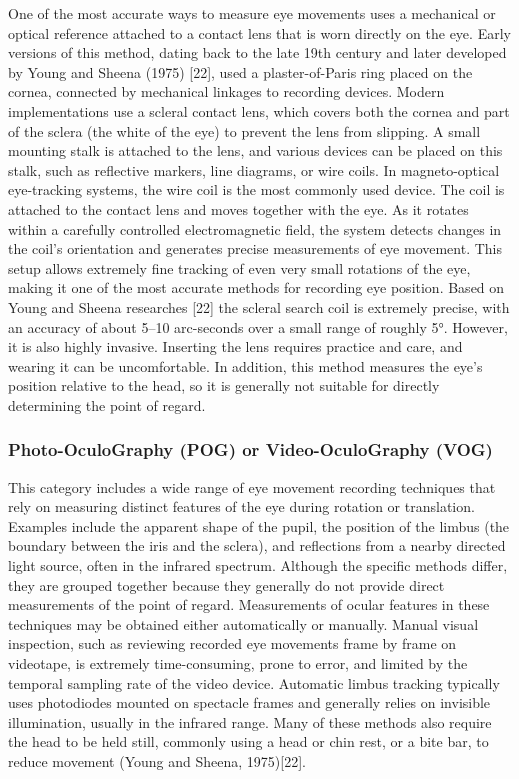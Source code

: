 \documentclass{article}
\begin{document}
One of the most accurate ways to measure eye movements uses a mechanical or optical reference attached to a contact lens that is worn directly on the eye. 
Early versions of this method, dating back to the late 19th century and later developed by Young and Sheena (1975) [22], used a plaster-of-Paris ring placed on the cornea, connected by mechanical linkages to recording devices.
Modern implementations use a scleral contact lens, which covers both the cornea and part of the sclera (the white of the eye) to prevent the lens from slipping.
A small mounting stalk is attached to the lens, and various devices can be placed on this stalk, such as reflective markers, line diagrams, or wire coils.
In magneto-optical eye-tracking systems, the wire coil is the most commonly used device. The coil is attached to the contact lens and moves together with the eye. 
As it rotates within a carefully controlled electromagnetic field, the system detects changes in the coil's orientation and generates precise measurements of eye movement. This setup allows extremely fine tracking of even very small rotations of the eye, making it one of the most accurate methods for recording eye position.
Based on Young and Sheena researches [22] the scleral search coil is extremely precise, with an accuracy of about 5–10 arc-seconds over a small range of roughly 5°. 
However, it is also highly invasive. 
Inserting the lens requires practice and care, and wearing it can be uncomfortable. 
In addition, this method measures the eye's position relative to the head, so it is generally not suitable for directly determining the point of regard.

\subsubsection{Photo-OculoGraphy (POG) or Video-OculoGraphy (VOG)}

This category includes a wide range of eye movement recording techniques that rely on measuring distinct features of the eye during rotation or translation. 
Examples include the apparent shape of the pupil, the position of the limbus (the boundary between the iris and the sclera), and reflections from a nearby directed light source, often in the infrared spectrum. 
Although the specific methods differ, they are grouped together because they generally do not provide direct measurements of the point of regard. 
Measurements of ocular features in these techniques may be obtained either automatically or manually.
Manual visual inspection, such as reviewing recorded eye movements frame by frame on videotape, is extremely time-consuming, prone to error, and limited by the temporal sampling rate of the video device.
Automatic limbus tracking typically uses photodiodes mounted on spectacle frames and generally relies on invisible illumination, usually in the infrared range. Many of these methods also require the head to be held still, commonly using a head or chin rest, or a bite bar, to reduce movement (Young and Sheena, 1975)[22].
\end{document}
